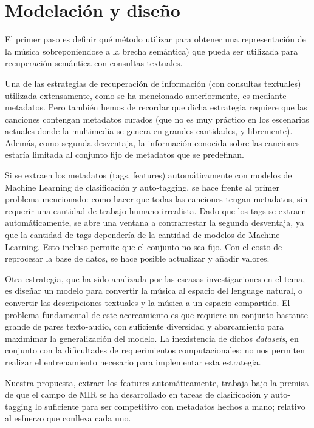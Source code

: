\section{Modelación y diseño}
\label{sec:design}
El primer paso es definir qué método utilizar para obtener una representación de la música sobreponiendose a la brecha semántica) que pueda ser 
utilizada para recuperación semántica con consultas textuales.

Una de las estrategias de recuperación de información (con consultas textuales) utilizada extensamente, como se ha mencionado anteriormente, es mediante metadatos. Pero también hemos de recordar que dicha estrategia requiere que las canciones contengan metadatos curados (que no es muy práctico en los escenarios actuales donde la multimedia se genera en grandes cantidades, y libremente). Además, como segunda desventaja, la información conocida sobre las canciones estaría limitada al conjunto fijo de metadatos que se predefinan. %

Si se extraen los metadatos (tags, features) automáticamente con modelos de Machine Learning de clasificación y auto-tagging, se hace frente al primer problema mencionado: como hacer que todas las canciones tengan metadatos, sin requerir una cantidad de trabajo humano irrealista. Dado que los tags se extraen automáticamente, se abre una ventana a contrarrestar la segunda desventaja, ya que la cantidad de tags dependería de la cantidad de modelos de Machine Learning. Esto incluso permite que el conjunto no sea fijo. Con el costo de reprocesar la base de datos, se hace posible actualizar y añadir valores.

Otra estrategia, que ha sido analizada por las escasas investigaciones en el tema, es diseñar un modelo para convertir la música al espacio del lenguage natural, o convertir las descripciones textuales y la música a un espacio compartido. El problema fundamental de este acercamiento es que requiere un conjunto bastante grande de pares texto-audio, con suficiente diversidad y abarcamiento para maximimar la generalización del modelo. La inexistencia de dichos \textit{datasets}, en conjunto con la dificultades de requerimientos computacionales; no nos permiten realizar el entrenamiento necesario para implementar esta estrategia. %

Nuestra propuesta, extraer los features automáticamente, trabaja bajo la premisa de que el campo de MIR se ha desarrollado en tareas de clasificación y auto-tagging lo suficiente para ser competitivo con metadatos hechos a mano; relativo al esfuerzo que conlleva cada uno.\\ %


